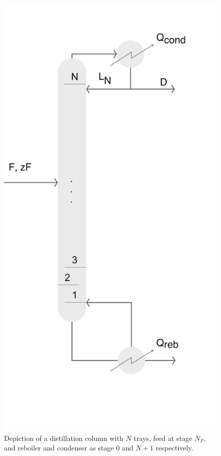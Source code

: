 \begin{figure}
    \centering
    \includegraphics{gfx/Chapter06/basic_column.png}
    \caption{Depiction of a distillation column with $N$ trays, feed at stage $N_F$, and reboiler and condenser as stage 0 and $N+1$ respectively.}
    \label{fig:column}
\end{figure}



